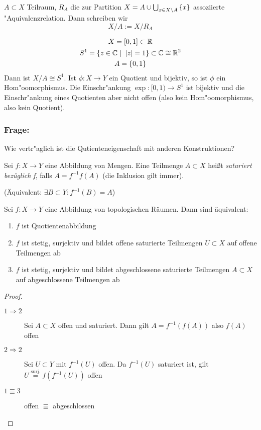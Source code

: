 \begin{dfn}
    $A\subset X$ Teilraum, $R_A$ die zur Partition $X=A\cup \bigcup_{x\in
    X\setminus A} \mdef{x}$ assoziierte "Aquivalenzrelation. Dann schreiben wir
    \[
    X/A := X/R_A
    \]
    \begin{bsp}
        \begin{gather}
            X = [0,1]\subset \R \\
            S^1 = \mdef[z\in\C]{\left|z\right|=1}\subset \C \cong \R^2 \\
            A = \mdef{0,1}
        \end{gather}
        Dann ist $X/A \cong S^1$. Ist $\phi:X\to Y$ ein Quotient und bijektiv,
        so ist $\phi$ ein Hom"oomorphismus. Die Einschr"ankung $\exp : [0,1)
        \to S^1$ ist bijektiv und die Einschr"ankung eines Quotienten aber
        nicht offen (also kein Hom"oomorphismus, also kein Quotient).

        \subsubsection*{Frage:} Wie vertr"aglich ist die Qutienteneigenschaft
        mit anderen Konstruktionen?
    \end{bsp}
\end{dfn}

\begin{dfn}
    Sei  $f:X\to Y$ eine Abbildung von Mengen. Eine Teilmenge $A\subset X$ heißt
    \emph{saturiert bezüglich f}, falls $A=f^{-1}f(A)$ (die Inklusion gilt
    immer).

    (Äquivalent: $\exists B\subset Y: f^{-1}(B) = A$)
\end{dfn}

\begin{stz}
    Sei $f:X\to Y$ eine Abbildung von topologischen Räumen. Dann sind
    äquivalent:
    \begin{enumerate}
        \item $f$ ist Quotientenabbildung
        \item $f$ ist stetig, surjektiv und bildet offene saturierte Teilmengen
            $U\subset X$ auf offene Teilmengen ab
        \item $f$ ist stetig, surjektiv und bildet abgeschlossene saturierte
            Teilmengen $A\subset X$ auf abgeschlossene Teilmengen ab
    \end{enumerate}
    \begin{proof}
        \begin{description}
            \item[$1 \Rightarrow 2$] Sei $A\subset X$ offen und saturiert. Dann
                gilt $A = f^{-1}(f(A))$ also $f(A)$ offen
            \item[$2 \Rightarrow 2$] Sei $U\subset Y$ mit $f^{-1}(U)$ offen. Da
                $f^{-1}(U)$ saturiert ist, gilt $U \overset{\mathrm{surj.}}{=}
                f(f^{-1}(U))$ offen
            \item[$1 \Equiv 3$] offen $\Equiv$ abgeschlossen
        \end{description}
    \end{proof}
\end{stz}

